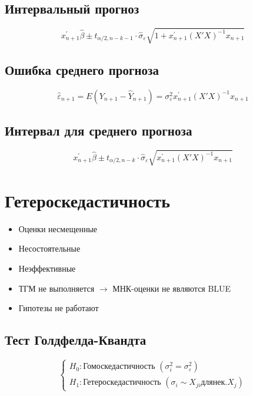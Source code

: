 \documentclass[a4paper, 12pt]{article}
\begin{document}
\subsection{Интервальный прогноз}

\[x_{n + 1}^{\prime}\hat{\beta} \pm
t_{\alpha / 2, n - k - 1} \cdot
\hat{\sigma}_{\varepsilon}
\sqrt{1 + x^{\prime}_{n + 1} 
(X'X)^{-1} x_{n + 1}}\]

\subsection{Ошибка среднего прогноза}

\[\hat{\varepsilon}_{n + 1} = 
E(Y_{n + 1} - \hat{Y}_{n + 1}) = 
\sigma_{\varepsilon}^2 x^{\prime}_{n + 1}
(X'X)^{-1}x_{n + 1}\]

\subsection{Интервал для среднего прогноза}

\[x_{n + 1}^{\prime}\hat{\beta} \pm 
t_{\alpha / 2, n - k} \cdot
\hat{\sigma}_{\varepsilon}
\sqrt{x^{\prime}_{n + 1} 
(X'X)^{-1} x_{n + 1}}\]

\section{Гетероскедастичность}

\begin{itemize}
    \item Оценки несмещенные
    \item Несостоятельные
    \item Неэффективные
    \item ТГМ не выполняется $\rightarrow$ МНК-оценки не являются BLUE
    \item Гипотезы не работают
\end{itemize}

\subsection{Тест Голдфелда-Квандта}

\[\begin{cases}
    H_{0}: \textrm{Гомоскедастичность } (\sigma_{i}^{2} = \sigma_{\varepsilon}^{2}) \\
    H_{1}: \textrm{Гетероскедастичность } (\sigma_{i} \sim X_{ji} для нек. X_{j})
\end{cases}\]
\end{document}
